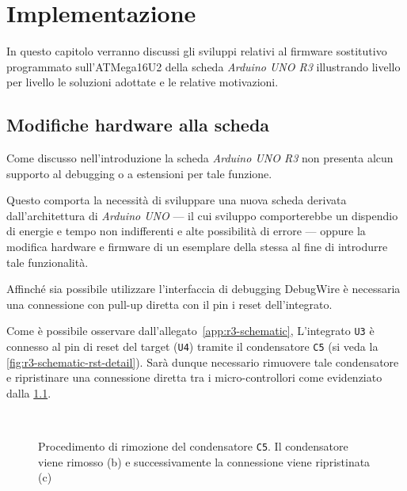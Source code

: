 \chapter{Implementazione}

In questo capitolo verranno discussi gli sviluppi relativi al firmware sostitutivo programmato sull'ATMega16U2 della scheda \textit{Arduino UNO R3} illustrando livello per livello le soluzioni adottate e le relative motivazioni.

\section{Modifiche hardware alla scheda}\label{s:dw-board-mod}

Come discusso nell'introduzione la scheda \textit{Arduino UNO R3} non presenta alcun supporto al debugging o a estensioni per tale funzione.

Questo comporta la necessità di sviluppare una nuova scheda derivata dall'architettura di \textit{Arduino UNO} --- il cui sviluppo comporterebbe un dispendio di energie e tempo non indifferenti e alte possibilità di errore --- oppure la modifica hardware e firmware di un esemplare della stessa al fine di introdurre tale funzionalità.

Affinché sia possibile utilizzare l'interfaccia di debugging DebugWire è necessaria una connessione con pull-up diretta con il pin i reset dell'integrato.

Come è possibile osservare dall'allegato~\ref{app:r3-schematic}, L'integrato \texttt{U3} è connesso al pin di reset del target (\texttt{U4}) tramite il condensatore \texttt{C5} (si veda la \cref{fig:r3-schematic-rst-detail}). Sarà dunque necessario rimuovere tale condensatore e ripristinare una connessione diretta tra i micro-controllori come evidenziato dalla \cref{fig:remove-c5}.

\begin{figure}[t]
    \hfill
    \begin{minipage}{.45\textwidth}
    \end{minipage}
    \begin{minipage}{.45\textwidth}
         \\
    \end{minipage}
    \hfill
    \caption[]{Procedimento di rimozione del condensatore \texttt{C5}. Il condensatore viene rimosso (b) e successivamente la connessione viene ripristinata (c)}\label{fig:remove-c5}
\end{figure}

